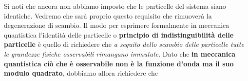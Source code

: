 Si noti che ancora non abbiamo imposto che le particelle del sistema siano identiche.
Vedremo che sarà proprio questo requisito che rimuoverà la degenerazione di scambio.
Il modo per esprimere formalmente in meccanica quantistica l’identità delle particelle o \textbf{principio di
indistinguibilità delle particelle} è quello di richiedere che \emph{a seguito dello scambio delle particelle tutte le
grandezze fisiche osservabili rimangano immutate}.
Dato che \textbf{in meccanica quantistica ciò che è osservabile non è la funzione d’onda ma il suo modulo quadrato}, dobbiamo allora  richiedere che
%
%
%
%
